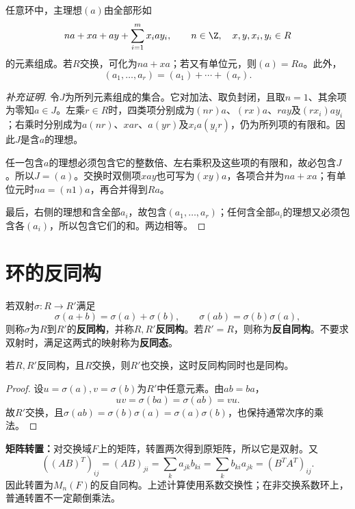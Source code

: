 \begin{proposition}
任意环中，主理想$(a)$由全部形如
\[
na+xa+ay+\sum_{i=1}^m x_iay_i,
\qquad n\in\Z,\quad x,y,x_i,y_i\in R
\]
的元素组成。若$R$交换，可化为$na+xa$；若又有单位元，则$(a)=Ra$。此外，
\[
(a_1,\ldots,a_r)=(a_1)+\cdots+(a_r).
\]
\end{proposition}
\begin{proof}[补充证明]
令$J$为所列元素组成的集合。它对加法、取负封闭，且取$n=1$、其余项为零知$a\in J$。左乘$r\in R$时，四类项分别成为$(nr)a$、$(rx)a$、$ray$及$(rx_i)ay_i$；右乘时分别成为$a(nr)$、$xar$、$a(yr)$及$x_i a(y_ir)$，仍为所列项的有限和。因此$J$是含$a$的理想。

任一包含$a$的理想必须包含它的整数倍、左右乘积及这些项的有限和，故必包含$J$。所以$J=(a)$。交换时双侧项$xay$也可写为$(xy)a$，各项合并为$na+xa$；有单位元时$na=(n1)a$，再合并得到$Ra$。

最后，右侧的理想和含全部$a_i$，故包含$(a_1,\ldots,a_r)$；任何含全部$a_i$的理想又必须包含各$(a_i)$，所以包含它们的和。两边相等。
\end{proof}


\section{环的反同构}


\begin{definition}
若双射$\sigma:R\to R'$满足
\[
\sigma(a+b)=\sigma(a)+\sigma(b),\qquad
\sigma(ab)=\sigma(b)\sigma(a),
\]
则称$\sigma$为$R$到$R'$的\textbf{反同构}，并称$R,R'$\textbf{反同构}。若$R'=R$，则称为\textbf{反自同构}。不要求双射时，满足这两式的映射称为\textbf{反同态}。
\end{definition}

\begin{proposition}
若$R,R'$反同构，且$R$交换，则$R'$也交换，这时反同构同时也是同构。
\end{proposition}
\begin{proof}
设$u=\sigma(a),v=\sigma(b)$为$R'$中任意元素。由$ab=ba$，
\[
uv=\sigma(ba)=\sigma(ab)=vu.
\]
故$R'$交换，且$\sigma(ab)=\sigma(b)\sigma(a)=\sigma(a)\sigma(b)$，也保持通常次序的乘法。
\end{proof}

\begin{example}
\textbf{矩阵转置：}对交换域$F$上的矩阵，转置两次得到原矩阵，所以它是双射。又
\[
((AB)^T)_{ij}=(AB)_{ji}=\sum_k a_{jk}b_{ki}
=\sum_k b_{ki}a_{jk}=(B^TA^T)_{ij}.
\]
因此转置为$M_n(F)$的反自同构。上述计算使用系数交换性；在非交换系数环上，普通转置不一定颠倒乘法。
\end{example}

